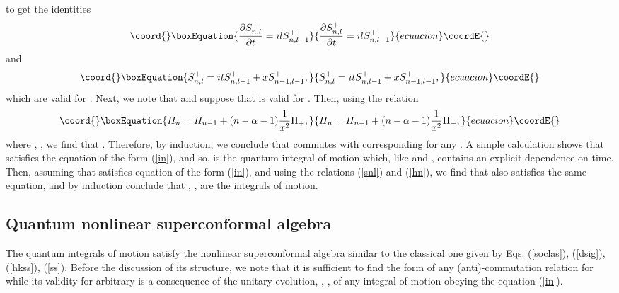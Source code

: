\documentclass[a4paper,12pt]{article}
\def\N{\mathbb N}
\begin{document}
to  get the identities
\begin{equation}\coord{}\boxEquation{
\frac{\partial S^+_{n,l}}{\partial t}=ilS^+_{n,l-1}
\label{sl1}
}{
\frac{\partial S^+_{n,l}}{\partial t}=ilS^+_{n,l-1}
}{ecuacion}\coordE{}\end{equation}
and
\begin{equation}\coord{}\boxEquation{
S^+_{n,l}=itS^+_{n,l-1}+xS^+_{n-1,l-1},
\label{snl}
}{
S^+_{n,l}=itS^+_{n,l-1}+xS^+_{n-1,l-1},
}{ecuacion}\coordE{}\end{equation}
which are valid for \coordHE{}.
Next, we note that
\coordHE{}
and suppose that
 \coordHE{}
 is valid for \coordHE{}.
Then, using the relation
\begin{equation}\coord{}\boxEquation{
H_n=H_{n-1}+(n-\alpha-1)\frac{1}{x^2}\Pi_+,
\label{hn}
}{
H_n=H_{n-1}+(n-\alpha-1)\frac{1}{x^2}\Pi_+,
}{ecuacion}\coordE{}\end{equation}
where
\coordHE{}  \myHighlight{$\Pi_+\psi^+=\psi^+$}\coordHE{},
\coordHE{},
we find that
\coordHE{}. Therefore, by induction,
we conclude that \coordHE{} commutes with
corresponding \coordHE{}
for any \myHighlight{$n\in\N$}\coordHE{}.
A simple
calculation shows that
\coordHE{} satisfies the equation of the form (\ref{in}),
and so, is the quantum integral of motion
which, like \coordHE{}
and \coordHE{}, contains
an explicit dependence on time.
Then, assuming that \coordHE{} satisfies equation
of the form (\ref{in}),
and using the relations (\ref{snl}) and (\ref{hn}),
we find that \coordHE{} also satisfies the same equation,
and by induction conclude that
\coordHE{}, \coordHE{},
are the integrals of motion.

\subsection{Quantum nonlinear superconformal algebra}

The quantum integrals of motion satisfy
the nonlinear superconformal algebra
similar to the classical one given by Eqs.
(\ref{soclas}), (\ref{dsig}), (\ref{hkss}),
(\ref{ss}).
Before the discussion of its structure,
we note that it is sufficient
to find the form of any (anti)-commutation
relation for \coordHE{} while its validity for arbitrary \coordHE{}
is a consequence of the unitary evolution,
\coordHE{}, \coordHE{},
of any integral of motion \coordHE{} obeying the equation
(\ref{in}).
\end{document}
